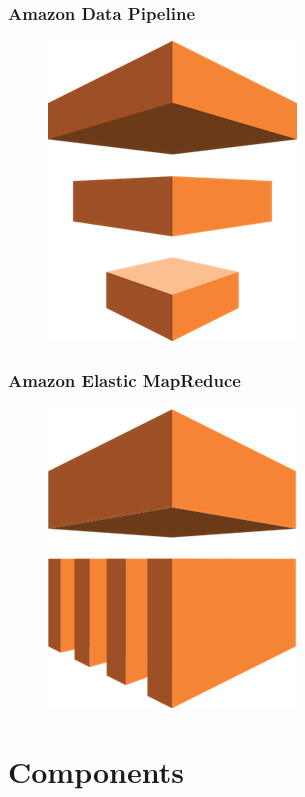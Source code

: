 \subsubsection{Amazon Data Pipeline} \label{data_pipeline}

\begin{figure}[H]
\includegraphics[scale=0.1]{resources/data_pipeline-logo.png}
\end{figure}

\subsubsection{Amazon Elastic MapReduce} \label{emr}

\begin{figure}[H]
\includegraphics[scale=0.1]{resources/emr-logo.png}
\end{figure}



\section{Components}




